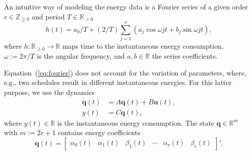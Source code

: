 \documentclass[letterpaper,10pt,journal,twoside]{IEEEtran}
\theoremstyle{definition}
\begin{document}



An intuitive way of modeling the energy data is a Fourier series of a given order $r\in\mathbb{Z}_{\geq 0}$ and period $T\in\mathbb{R}_{>0}$
\begin{equation}\label{eq:fourier}
  h(t)=a_0/T+(2/T)\sum_{j=1}^{r}{\left(a_j\cos{\omega jt}+b_j\sin{\omega jt}\right)},
\end{equation}
where $h:\mathbb{R}_{\geq 0}\rightarrow\mathbb{R}$ maps time to the instantaneous energy consumption, $\omega:=2\pi/T$ is the angular frequency, and $a,b\in\mathbb{R}$ the series coefficients.

Equation~(\ref{eq:fourier}) does not account for the variation of parameters, where, e.g., two schedules result in different instantaneous energies.
For this latter purpose, we use the dynamics %
\begin{subequations}\label{eq:state-perf}\begin{align}
  \dot{\mathbf{q}}(t)&=A\mathbf{q}(t)+B\mathbf{u}(t),\label{eq:state-perf-q}\\
  y(t)&=C\mathbf{q}(t),\label{eq:state-perf-y}
\end{align}\end{subequations}
where $y(t)\in\mathbb{R}$ is the instantaneous energy consumption. The state $\mathbf{q}\in\mathbb{R}^m$ with $m:=2r+1$ contains energy coefficients
\begin{equation}
  \mathbf{q}(t)=\begin{bmatrix}
    \alpha_0(t) & \alpha_1(t) & \beta_1(t) & \cdots & \alpha_r(t) & \beta_r(t)
  \end{bmatrix}'.
\end{equation}
\end{document}
